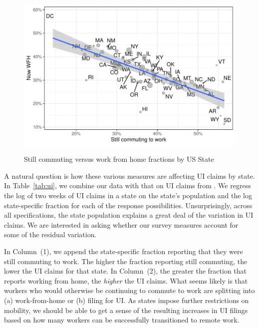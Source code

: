\documentclass[12pt]{article}
\begin{document}
\begin{figure}
  \caption{Still commuting versus work from home fractions by US State} \label{fig:commute_vs_wfh}
\centering
\begin{minipage}{0.8 \linewidth}
  \includegraphics[width = \linewidth]{plots/commute_vs_wfh.pdf} \\
  \begin{footnotesize}
    \end{footnotesize}
\end{minipage}
\end{figure} 

A natural question is how these various measures are affecting UI claims by state. 
In Table~\ref{tab:ui}, we combine our data with that on UI claims from \cite{goldsmith2020}.
We regress the log of two weeks of UI claims in a state on the state's population and the log state-specific fraction for each of the response possibilities.  
Unsurprisingly, across all specifications, the state population explains a great deal of the variation in UI claims.
We are interested in asking whether our survey measures account for some of the residual variation.



In Column~(1), we append the state-specific fraction reporting that they were still commuting to work.
The higher the fraction reporting still commuting, the lower the UI claims for that state.
In Column~(2), the greater the fraction that reports working from home, the \emph{higher} the UI claims.
What seems likely is that workers who would otherwise be continuing to commute to work are splitting into (a) work-from-home or (b) filing for UI.
As states impose further restrictions on mobility, we should be able to get a sense of the resulting increases in UI filings based on how many workers can be successfully transitioned to remote work. 
\end{document}
